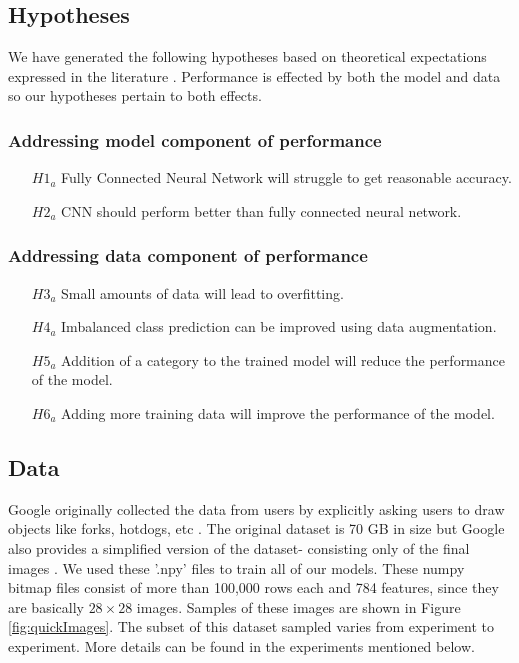 \documentclass[11pt]{article}
\begin{document}
\subsection{Hypotheses}

We have generated the following hypotheses based on theoretical
expectations expressed in the literature \cite{Goodfellow-et-al-2016,
  DeepLear51:online}. Performance is effected by both the model and
data \cite{DeepLear51:online} so our hypotheses pertain to both effects.

\subsubsection{Addressing model component of performance}

\begin{itemize}
  \item[$H1_a$] Fully Connected Neural Network will struggle to get reasonable
    accuracy.
  \item[$H2_a$] CNN should perform better than fully connected neural network.
  \end{itemize}

\subsubsection{Addressing data component of performance}

\begin{itemize}
\item[$H3_a$] Small amounts of data will lead to overfitting.
\item[$H4_a$] Imbalanced class prediction can be improved using data
  augmentation.
\item[$H5_a$] Addition of a category to the trained model will reduce the
  performance of the model.
\item[$H6_a$] Adding more training data will improve the performance of the
  model.
\end{itemize}

\subsection{Data}

Google originally collected the data from users by explicitly asking users to
draw objects like forks, hotdogs, etc \cite{QuickDra91:online}. The original
dataset is 70 GB in size but Google also provides a simplified version of the
dataset- consisting only of the final images \cite{googlecr61:online}. We
used these '.npy' files to train all of our models. These numpy bitmap files
consist of more than 100,000 rows each and 784
features, since they are basically $28 \times 28$ images. Samples of these
images are shown in Figure \ref{fig:quickImages}. The subset of this
dataset sampled varies from experiment to experiment. More details can be
found in the experiments mentioned below.
\end{document}
